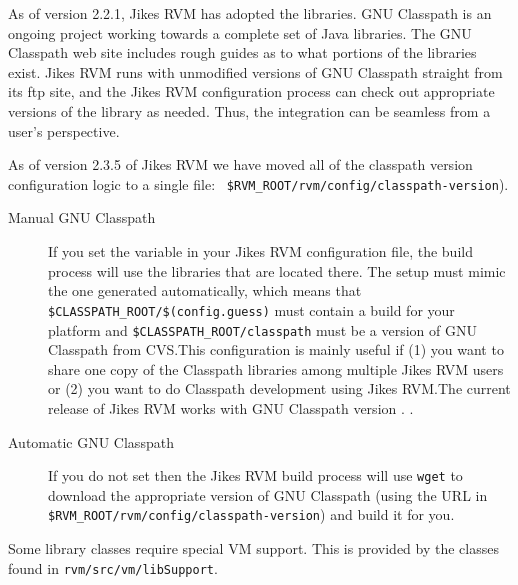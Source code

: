  As of version 2.2.1, Jikes\TMweb{} RVM has adopted the
 libraries.  GNU
Classpath is an ongoing project working towards a complete set of
Java\TMweb{} libraries.  The GNU Classpath web site includes
rough guides as to what portions of the libraries exist.  Jikes RVM
runs with unmodified versions of GNU Classpath straight from its ftp
site, and the Jikes RVM configuration process can check out
appropriate versions of the library as needed.  Thus, the integration
can be seamless from a user's perspective.

As of version 2.3.5 of Jikes RVM we have moved all of the classpath
version configuration logic to a single file: {\tt
\$RVM\_\-ROOT/\-rvm/\-config/\-classpath-version}). 

\begin{description}
\item[Manual GNU Classpath] If you set the  variable in
your Jikes RVM configuration file, the build process will use the
libraries that are located there.  The setup must mimic the one
generated automatically, which means that {\tt
\$CLASS\-PATH\_ROOT/\-\$(con\-fig.guess)} must contain a build for
your platform and {\tt \$CLASS\-PATH\_ROOT/\-class\-path} must be a
version of GNU Classpath from CVS.\@ This configuration is mainly
useful if (1) you want to share one copy of the Classpath libraries
among multiple Jikes RVM users or (2) you want to do Classpath
development using Jikes RVM.\@ The current release of Jikes RVM works
with GNU Classpath version
\classpathversion.  .

\item[Automatic GNU Classpath] If you do not set  
then the Jikes RVM build process will use {\tt wget} to download the
appropriate version of GNU Classpath (using the URL in {\tt
\$RVM\_\-ROOT/\-rvm/\-config/\-classpath-version}) and build it for you.
\end{description}

Some library classes require special VM support.  This is provided by
the classes found in {\tt rvm/\-src/\-vm/\-lib\-Sup\-port}. 

